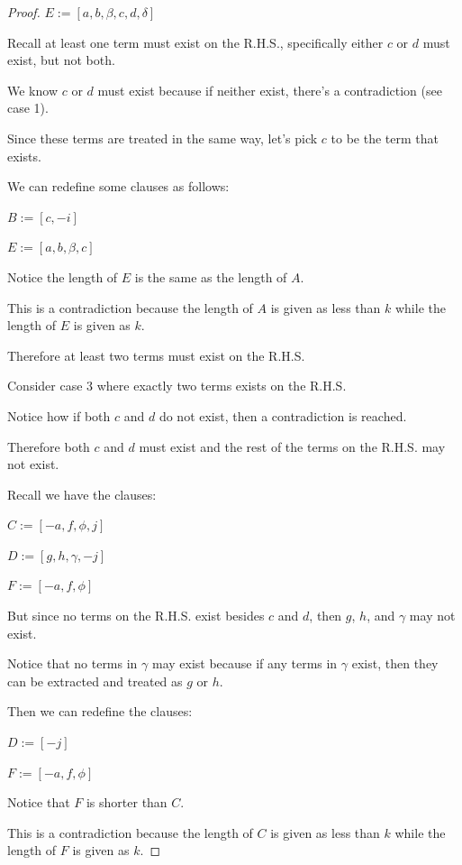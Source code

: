 \documentclass[manuscript]{acmart}
\begin{document}
\begin{proof}
        $E := [a, b, \beta, c, d, \delta]$

        Recall at least one term must exist on the R.H.S., specifically either $c$ or $d$ must exist, but not both.

        We know $c$ or $d$ must exist because if neither exist, there's a contradiction (see case 1).

        Since these terms are treated in the same way, let's pick $c$ to be the term that exists.

        We can redefine some clauses as follows:

        $B := [c, -i]$

        $E := [a, b, \beta, c]$

        Notice the length of $E$ is the same as the length of $A$.

        This is a contradiction because the length of $A$ is given as less than $k$ while the length of $E$ is given as $k$.

        Therefore at least two terms must exist on the R.H.S.

        Consider case 3 where exactly two terms exists on the R.H.S.

        Notice how if both $c$ and $d$ do not exist, then a contradiction is reached. 

        Therefore both $c$ and $d$ must exist and the rest of the terms on the R.H.S. may not exist.

        Recall we have the clauses:

        $C := [-a, f, \phi, j]$

        $D := [g, h, \gamma, -j]$

        $F := [-a, f, \phi]$

        But since no terms on the R.H.S. exist besides $c$ and $d$, then $g$, $h$, and $\gamma$ may not exist. 

        Notice that no terms in $\gamma$ may exist because if any terms in $\gamma$ exist, then they can be extracted and treated as $g$ or $h$.

        Then we can redefine the clauses:

        $D := [-j]$

        $F := [-a, f, \phi]$

        Notice that $F$ is shorter than $C$.

        This is a contradiction because the length of $C$ is given as less than $k$ while the length of $F$ is given as $k$.


\end{proof}
\end{document}
